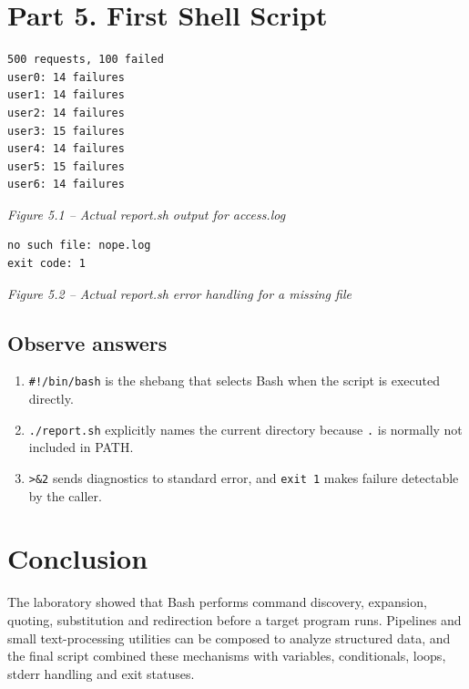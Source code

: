 \documentclass[12pt,a4paper]{article}
\newcommand{\figcap}[1]{\begin{center}\small\textit{#1}\end{center}\vspace{0.4em}}
\begin{document}
\section{Part 5. First Shell Script}
\begin{lstlisting}
500 requests, 100 failed
user0: 14 failures
user1: 14 failures
user2: 14 failures
user3: 15 failures
user4: 14 failures
user5: 15 failures
user6: 14 failures
\end{lstlisting}
\figcap{Figure 5.1 -- Actual report.sh output for access.log}

\begin{lstlisting}
no such file: nope.log
exit code: 1
\end{lstlisting}
\figcap{Figure 5.2 -- Actual report.sh error handling for a missing file}

\subsection{Observe answers}
\begin{enumerate}[label=\arabic*.]
\item \texttt{\#!/bin/bash} is the shebang that selects Bash when the script is executed directly.
\item \texttt{./report.sh} explicitly names the current directory because \texttt{.} is normally not included in PATH.
\item \texttt{>\&2} sends diagnostics to standard error, and \texttt{exit 1} makes failure detectable by the caller.
\end{enumerate}

\section{Conclusion}
The laboratory showed that Bash performs command discovery, expansion, quoting, substitution and redirection before a target program runs. Pipelines and small text-processing utilities can be composed to analyze structured data, and the final script combined these mechanisms with variables, conditionals, loops, stderr handling and exit statuses.
\end{document}
